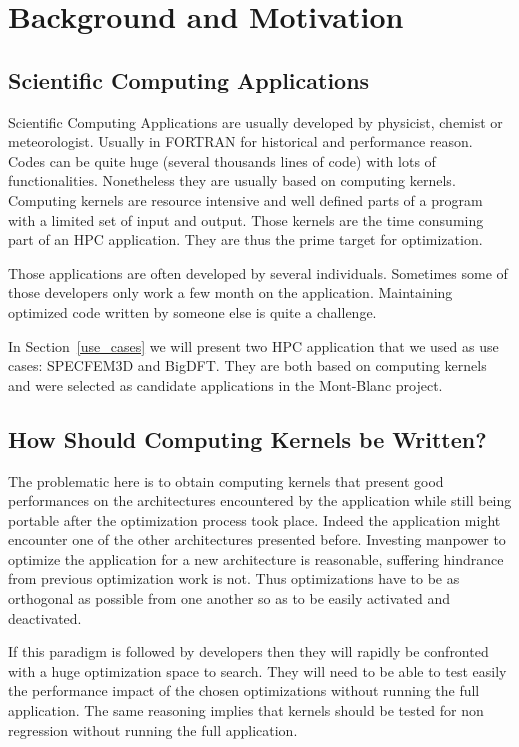\documentclass[11pt, a4paper, twoside]{montblanc}
\begin{document}
\section{Background and Motivation}

  \subsection{Scientific Computing Applications}

Scientific Computing Applications are usually developed by physicist, chemist or
meteorologist. Usually in FORTRAN for historical and performance reason. Codes
can be quite huge (several thousands lines of code) with lots of
functionalities. Nonetheless they are usually based on computing kernels.
Computing kernels are resource intensive and well defined parts of a program
with a limited set of input and output. Those kernels are the time consuming
part of an HPC application. They are thus the prime target for optimization.

Those applications are often developed by several individuals. Sometimes some of
those developers only work a few month on the application. Maintaining optimized
code written by someone else is quite a challenge.

In Section~\ref{use_cases} we will present two HPC application that we used
as use cases: SPECFEM3D and BigDFT. They are both based on computing
kernels and were selected as candidate applications in the Mont-Blanc project.

  \subsection{How Should Computing Kernels be Written?}

The problematic here is to obtain computing kernels that present good
performances on the architectures encountered by the application while still
being portable after the optimization process took place. Indeed the application
might encounter one of the other architectures presented before. Investing
manpower to optimize the application for a new architecture is reasonable,
suffering hindrance from previous optimization work is not. Thus optimizations
have to be as orthogonal as possible from one another so as to be easily
activated and deactivated.

If this paradigm is followed by developers then they will rapidly be confronted
with a huge optimization space to search. They will need to be able to test
easily the performance impact of the chosen optimizations without running the
full application. The same reasoning implies that kernels should be tested for
non regression without running the full application.
\end{document}
